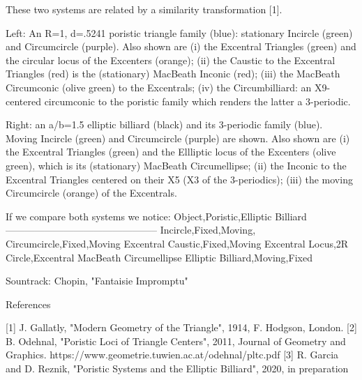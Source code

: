 These two systems are related by a similarity transformation [1].

Left: An R=1, d=.5241 poristic triangle family (blue): stationary Incircle (green) and Circumcircle (purple). Also shown are (i) the Excentral Triangles (green) and the circular locus of the Excenters (orange); (ii) the Caustic to the Excentral Triangles (red) is the (stationary) MacBeath Inconic (red); (iii) the MacBeath Circumconic (olive green) to the Excentrals; (iv) the Circumbilliard: an X9-centered circumconic to the poristic family which renders the latter a 3-periodic.

Right: an a/b=1.5 elliptic billiard (black) and its 3-periodic family (blue). Moving Incircle (green) and Circumcircle (purple) are shown. Also shown are (i) the Excentral Triangles (green) and the Ellliptic locus of the Excenters (olive green), which is its (stationary) MacBeath Circumellipse; (ii) the Inconic to  the Excentral Triangles centered on their X5 (X3 of the 3-periodics); (iii) the moving Circumcircle (orange) of the Excentrals.

If we compare both systems we notice:
Object,Poristic,Elliptic Billiard
-----------------------------------------------
Incircle,Fixed,Moving,
Circumcircle,Fixed,Moving
Excentral Caustic,Fixed,Moving
Excentral Locus,2R Circle,Excentral MacBeath Circumellipse
Elliptic Billiard,Moving,Fixed

Sountrack: Chopin, "Fantaisie Impromptu"

References

[1] J. Gallatly, "Modern Geometry of the Triangle", 1914, F. Hodgson, London.
[2] B. Odehnal, "Poristic Loci of Triangle Centers", 2011, Journal of Geometry and Graphics. https://www.geometrie.tuwien.ac.at/odehnal/pltc.pdf
[3] R. Garcia and D. Reznik, "Poristic Systems and the Elliptic Billiard", 2020, in preparation